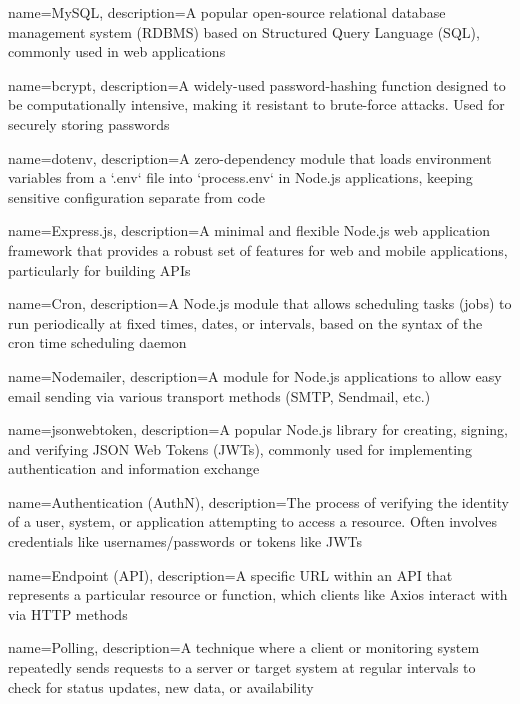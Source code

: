 {
    name=MySQL,
    description={A popular open-source relational database management system (RDBMS) based on Structured Query Language (SQL), commonly used in web applications}
}

{
    name=bcrypt,
    description={A widely-used password-hashing function designed to be computationally intensive, making it resistant to brute-force attacks. Used for securely storing passwords}
}

{
    name=dotenv,
    description={A zero-dependency module that loads environment variables from a `.env` file into `process.env` in Node.js applications, keeping sensitive configuration separate from code}
}

{
    name=Express.js,
    description={A minimal and flexible Node.js web application framework that provides a robust set of features for web and mobile applications, particularly for building APIs}
}

{
    name=Cron,
    description={A Node.js module that allows scheduling tasks (jobs) to run periodically at fixed times, dates, or intervals, based on the syntax of the cron time scheduling daemon}
}

{
    name=Nodemailer,
    description={A module for Node.js applications to allow easy email sending via various transport methods (SMTP, Sendmail, etc.)}
}


{
    name=jsonwebtoken,
    description={A popular Node.js library for creating, signing, and verifying JSON Web Tokens (JWTs), commonly used for implementing authentication and information exchange}
}



{
    name=Authentication (AuthN),
    description={The process of verifying the identity of a user, system, or application attempting to access a resource. Often involves credentials like usernames/passwords or tokens like JWTs}
}





{
    name={Endpoint (API)},
    description={A specific URL within an API that represents a particular resource or function, which clients like Axios interact with via HTTP methods}
}

{
    name=Polling,
    description={A technique where a client or monitoring system repeatedly sends requests to a server or target system at regular intervals to check for status updates, new data, or availability}
}

